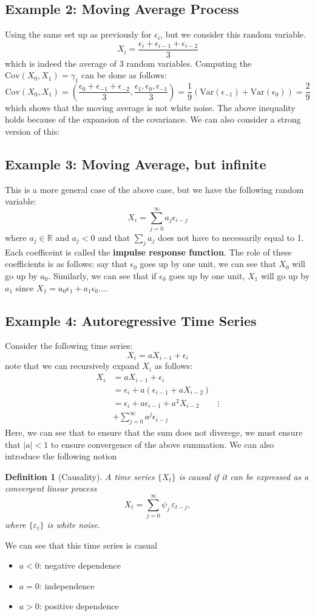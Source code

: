 \documentclass[12pt]{article}
\newtheorem{definition}{Definition}
\newcommand{\R}{\mathbb{R}}
\newcommand{\Var}{\text{Var}}
\newcommand{\Cov}{\text{Cov}}
\begin{document}
\subsection{Example 2: Moving Average Process}
Using the same set up as previously for $\epsilon_i$, but we consider this random variable. 
\[
	X_i = \frac{\epsilon_i + \epsilon_{i-1} + \epsilon_{i - 2}}{3}
\]
which is indeed the average of 3 random variables. Computing the $\Cov(X_0, X_1) = \gamma_1$ can be done as follows:
\[
	\Cov(X_0, X_1) = \left( \frac{\epsilon_0 + \epsilon_{-1} + \epsilon_{-2}}{3}, \frac{\epsilon_1, \epsilon_0, \epsilon_{-1}}{3} \right) = \frac{1}{9}(\Var(\epsilon_{-1})+\Var(\epsilon_{0})) = \frac{2}{9}
\]
which shows that the moving average is not white noise. The above inequality holds because of the expansion of the covariance. We can also consider a strong version of this:
\subsection{Example 3: Moving Average, but infinite}
This is a more general case of the above case, but we have the following random variable:
\[
	X_i = \sum_{j = 0}^\infty a_j \epsilon_{i - j} 
\]
where $a_j \in \R$ and $a_j < 0$ and that $\sum_j a_j$ does not have to necessarily equal to 1. Each coefficeint is called the \textbf{impulse response function}. The role of these coefficients is as follows: say that $\epsilon_0$ goes up by one unit, we can see that $X_0$ will go up by $a_0$. Similarly, we can see that if $\epsilon_0$ goes up by one unit, $X_1$ will go up by $a_1$ since $X_1 = a_0 \epsilon_1 + a_1 \epsilon_0 \dots $. 
\subsection{Example 4: Autoregressive Time Series}
Consider the following time series: 
\[
	X_i = aX_{i-1} + \epsilon_i 
\]
note that we can recursively expand $X_i$ as follows:
\begin{align*}
	X_i &= aX_{i-1} + \epsilon_i\\
	    &= \epsilon_i + a(\epsilon_{i-1} + aX_{i-2})\\ 
	    &= \epsilon_i + a\epsilon_{i-1} + a^2X_{i-2}
	    &\vdots \\
	    &+ \sum_{j = 0}^\infty a^j \epsilon_{i - j}
\end{align*}
 Here, we can see that to ensure that the sum does not diverege, we must ensure that $|a| < 1$ to ensure convergence of the above summation. We can also introduce the following notion
 \begin{definition}[Causality]
A time series $\{X_t\}$ is causal if it can be expressed as a convergent linear process
\[
X_t = \sum_{j=0}^{\infty} \psi_j \,\varepsilon_{t-j},
\]
where $\{\varepsilon_t\}$ is white noise.
\end{definition}
We can see that this time series is casual
\begin{itemize}
	\item $a < 0$: negative dependence
	\item $a = 0$: independence 
	\item $a > 0$: positive dependence
\end{itemize}
\end{document}
